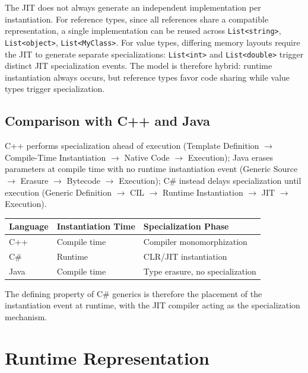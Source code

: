 \documentclass[11pt]{report}
\begin{document}
The JIT does not always generate an independent implementation per
instantiation. For reference types, since all references share a compatible
representation, a single implementation can be reused across
\texttt{List<string>}, \texttt{List<object>}, \texttt{List<MyClass>}. For
value types, differing memory layouts require the JIT to generate separate
specializations: \texttt{List<int>} and \texttt{List<double>} trigger
distinct JIT specialization events. The model is therefore hybrid: runtime
instantiation always occurs, but reference types favor code sharing while
value types trigger specialization.


\subsection{Comparison with C++ and Java}

C++ performs specialization ahead of execution (Template Definition
$\rightarrow$ Compile-Time Instantiation $\rightarrow$ Native Code
$\rightarrow$ Execution); Java erases parameters at compile time with no
runtime instantiation event (Generic Source $\rightarrow$ Erasure
$\rightarrow$ Bytecode $\rightarrow$ Execution); C\# instead delays
specialization until execution (Generic Definition $\rightarrow$ CIL
$\rightarrow$ Runtime Instantiation $\rightarrow$ JIT $\rightarrow$
Execution).

\begin{table}[h]
\centering
\begin{tabular}{lll}
\hline
Language & Instantiation Time & Specialization Phase \\
\hline
C++ & Compile time & Compiler monomorphization \\
C\# & Runtime & CLR/JIT instantiation \\
Java & Compile time & Type erasure, no specialization \\
\hline
\end{tabular}
\end{table}

The defining property of C\# generics is therefore the placement of the
instantiation event at runtime, with the JIT compiler acting as the
specialization mechanism.


\section{Runtime Representation}
\label{CSharpGenerics:RuntimeRepresentation}
\end{document}
